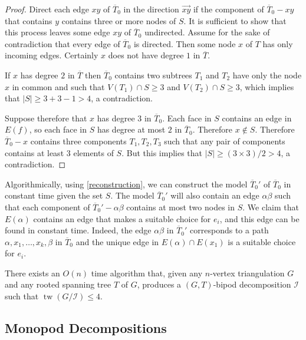 \documentclass{patmorin}
\DeclareMathOperator{\tw}{tw}
\begin{document}
\begin{proof}
  Direct each edge $xy$ of $\overline{T}_0$ in the direction $\overrightarrow{xy}$ if the component of $\overline{T}_0-xy$ that contains $y$ contains three or more nodes of $S$.  It is sufficient to show that this process leaves some edge $xy$ of $\overline{T}_0$ undirected.  Assume for the sake of contradiction that every edge of $\overline{T}_0$ is directed.  Then some node $x$ of $T$ has only incoming edges. Certainly $x$ does not have degree $1$ in $\overline{T}$.

  If $x$ has degree $2$ in $\overline{T}$ then $\overline{T}_0$ contains two subtrees $T_1$ and $T_2$ have only the node $x$ in common and such that $V(T_1)\cap S\ge 3$ and $V(T_2)\cap S\ge 3$, which implies that $|S|\ge 3+3-1 > 4$, a contradiction.

  Suppose therefore that $x$ has degree $3$ in $\overline{T}_0$.  Each face in $S$ contains an edge in $E(f)$, so each face in $S$ has degree at most $2$ in $\overline{T}_0$.  Therefore $x\not\in S$.  Therefore $\overline{T}_0-x$ contains three components $T_1, T_2, T_3$ such that any pair of components contains at least $3$ elements of $S$.  But this implies that $|S|\ge (3\times 3)/2>4$, a contradiction.
\end{proof}



Algorithmically, using \cref{reconstruction}, we can construct the model $\overline{T}_0'$ of $\overline{T}_0$ in constant time given the set $S$.  The model $\overline{T}_0'$ will also contain an edge $\alpha\beta$ such that each component of $\overline{T}_0'-\alpha\beta$ contains at most two nodes in $S$. We claim that $E(\alpha)$  contains an edge that makes a suitable choice for $e_i$, and this edge can be found in constant time.  Indeed, the edge $\alpha\beta$ in  $\overline{T}_0'$ corresponds to a path $\alpha,x_1,\ldots,x_k,\beta$ in $\overline{T}_0$ and the unique edge in $E(\alpha)\cap E(x_1)$ is a suitable choice for $e_i$.

\begin{thm}\label{bipod_decomposition_algorithm}
  There exists an $O(n)$ time algorithm that, given any $n$-vertex triangulation $G$ and any rooted spanning tree $T$ of $G$, produces a $(G,T)$-bipod decomposition $\mathcal{I}$ such that $\tw(G/\mathcal{I})\le 4$.
\end{thm}


\subsection{Monopod Decompositions}
\end{document}
